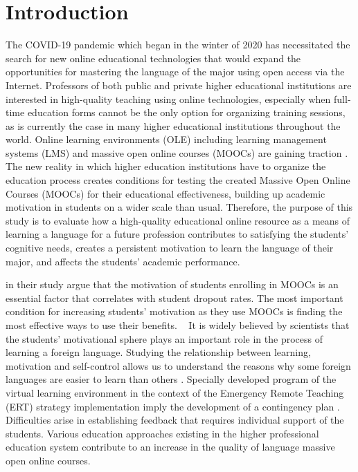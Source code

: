 \documentclass[english]{textolivre}
\begin{document}
\section{Introduction}\label{sec-intro}
The COVID-19 pandemic which began in the winter of 2020 has necessitated the search for new online educational technologies that would expand the opportunities for mastering the language of the major using open access via the Internet. Professors of both public and private higher educational institutions are interested in high-quality teaching using online technologies, especially when full-time education forms cannot be the only option for organizing training sessions, as is currently the case in many higher educational institutions throughout the world. Online learning environments (OLE) including learning management systems (LMS) and massive open online courses (MOOCs) are gaining traction \cite{barcena_role_2015,uddin_systematic_2021}. The new reality in which higher education institutions have to organize the education process creates conditions for testing the created Massive Open Online Courses (MOOCs) for their educational effectiveness, building up academic motivation in students on a wider scale than usual. Therefore, the purpose of this study is to evaluate how a high-quality educational online resource as a means of learning a language for a future profession contributes to satisfying the students’ cognitive needs, creates a persistent motivation to learn the language of their major, and affects the students’ academic performance.

\textcite{luik_are_2021} in their study argue that the motivation of students enrolling in MOOCs is an essential factor that correlates with student dropout rates. The most important condition for increasing students’ motivation as they use MOOCs is finding the most effective ways to use their benefits.
 
It is widely believed by scientists that the students’ motivational sphere plays an important role in the process of learning a foreign language. Studying the relationship between learning, motivation and self-control allows us to understand the reasons why some foreign languages are easier to learn than others \cite{zhu_relationship_2022}. Specially developed program of the virtual learning environment in the context of the Emergency Remote Teaching (ERT) strategy implementation imply the development of a contingency plan \cite{rodes_teacher_2021}. Difficulties arise in establishing feedback that requires individual support of the students. Various education approaches existing in the higher professional education system contribute to an increase in the quality of language massive open online courses.
\end{document}
